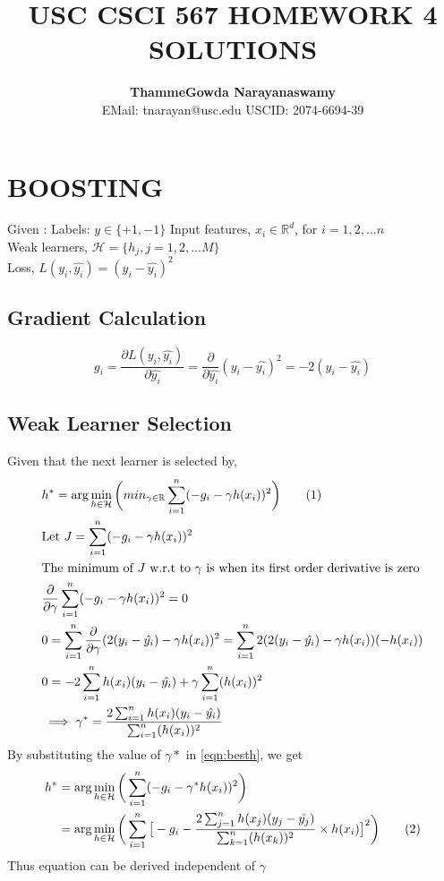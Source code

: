 \documentclass[a4paper,doc,notimes]{article}
\title{\noindent  \textbf{ USC CSCI 567 HOMEWORK 4 SOLUTIONS} }
\author{\textbf{ThammeGowda Narayanaswamy} \\
EMail: tnarayan@usc.edu  USCID: 2074-6694-39}
\newcommand\numberthis{\addtocounter{equation}{1}\tag{\theequation}}
\begin{document}
\maketitle

\section{ BOOSTING}
Given : \newline
Labels: $y \in \{+1, -1\}$  \newline
Input features, $x_i \in \mathbb{R}^d$,  for $i = 1, 2, ... n$ \\
Weak learners, $\mathcal{H} = \{h_j, j=1,2,... M \} $ \\
Loss, $L(y_i, \hat{y_i}) = (y_i - \hat{y_i})^2$


\subsection {Gradient Calculation}
\begin{equation}\label{eqn:gradient}
	g_i = \frac{\partial L(y_i, \hat{y_i})} {\partial \hat{y_i}} = \frac{\partial }{\partial \hat{y_i}} (y_i - \hat{y_i})^2 = -2 (y_i - \hat{y_i}) 
\end{equation}
\subsection {Weak Learner Selection}
Given that the next learner is selected by, \\
\begin{align*}
	& h^* =  \arg \min_{h\in\mathcal{H}} \bigg(min_{\gamma\in \mathbb{R}} \sum_{i=1}^{n} (-g_i - \gamma h(x_i))^2\bigg) \numberthis \label{eqn:besth}\\
	& \text{Let } J =  \sum_{i=1}^{n} (-g_i - \gamma h(x_i))^2 \\
	& \text{The minimum of $J$ w.r.t to $\gamma$ is when its first order derivative is zero} \\
	&\frac{\partial }{\partial \gamma} \sum_{i=1}^{n} (-g_i - \gamma h(x_i))^2= 0 \\
	& 0 = \sum_{i=1}^{n} \frac{\partial }{\partial \gamma}(2 (y_i - \hat{y_i}) - \gamma h(x_i))^2  = \sum_{i=1}^{n}  2 (2 (y_i - \hat{y_i}) - \gamma h(x_i)) ( - h(x_i)) \\
	& 0 = - 2\sum_{i=1}^{n} h(x_i)(y_i - \hat{y_i})  + \gamma  \sum_{i=1}^{n} (h(x_i))^2 \\
	& \implies \gamma^* = \frac{2\sum_{i=1}^{n} h(x_i)(y_i - \hat{y_i}) }{\sum_{i=1}^{n} (h(x_i))^2 }
\end{align*}
By substituting the value of $\gamma*$ in \ref{eqn:besth}, we get
\begin{align*}
	h^* &=  \arg \min_{h\in\mathcal{H}} \bigg(\sum_{i=1}^{n} (-g_i - \gamma^* h(x_i))^2\bigg)  \\
	& = \arg \min_{h\in\mathcal{H}} \bigg(\sum_{i=1}^{n} \big[-g_i - \frac{2\sum_{j=1}^{n} h(x_j)(y_j - \hat{y_j}) }{\sum_{k=1}^{n} (h(x_k))^2 } \times h(x_i)\big ]^2\bigg)  \numberthis \label{eqn:besth2}\\
\end{align*}
Thus equation  can be derived independent of $\gamma$
\end{document}
